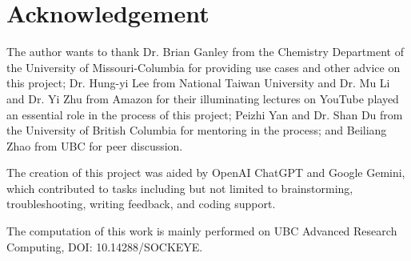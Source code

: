 \documentclass[conference]{IEEEtran}
\begin{document}
\section*{Acknowledgement}
The author wants to thank Dr. Brian Ganley from the Chemistry Department of the University of Missouri-Columbia for providing use cases and other advice on this project; Dr. Hung-yi Lee from National Taiwan University and Dr. Mu Li and Dr. Yi Zhu from Amazon for their illuminating lectures on YouTube played an essential role in the process of this project; Peizhi Yan and Dr. Shan Du from the University of British Columbia for mentoring in the process; and Beiliang Zhao from UBC for peer discussion.

The creation of this project was aided by OpenAI ChatGPT and Google Gemini, which contributed to tasks including but not limited to brainstorming, troubleshooting, writing feedback, and coding support.

The computation of this work is mainly performed on UBC Advanced Research Computing, DOI: 10.14288/SOCKEYE.

\printbibliography
\end{document}
